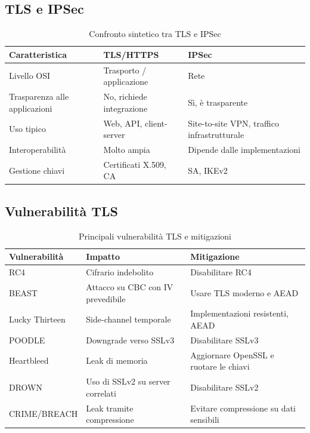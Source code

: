 \documentclass[12pt, a4paper]{report}
\begin{document}
\subsection{TLS e IPSec}
\begin{table}[h]
	\centering
	\caption{Confronto sintetico tra TLS e IPSec}
	\begin{tabular}{|p{3.5cm}|p{5.5cm}|p{5.5cm}|}
		\hline
		Caratteristica & TLS/HTTPS & IPSec \\
		\hline
		Livello OSI & Trasporto / applicazione & Rete \\
		\hline
		Trasparenza alle applicazioni & No, richiede integrazione & S\`i, \`e trasparente \\
		\hline
		Uso tipico & Web, API, client-server & Site-to-site VPN, traffico infrastrutturale \\
		\hline
		Interoperabilit\`a & Molto ampia & Dipende dalle implementazioni \\
		\hline
		Gestione chiavi & Certificati X.509, CA & SA, IKEv2 \\
		\hline
	\end{tabular}
\end{table}

\subsection{Vulnerabilit\`a TLS}
\begin{table}[h]
	\centering
	\caption{Principali vulnerabilit\`a TLS e mitigazioni}
	\begin{tabular}{|p{3.5cm}|p{5cm}|p{5cm}|}
		\hline
		Vulnerabilit\`a & Impatto & Mitigazione \\
		\hline
		RC4 & Cifrario indebolito & Disabilitare RC4 \\
		\hline
		BEAST & Attacco su CBC con IV prevedibile & Usare TLS moderno e AEAD \\
		\hline
		Lucky Thirteen & Side-channel temporale & Implementazioni resistenti, AEAD \\
		\hline
		POODLE & Downgrade verso SSLv3 & Disabilitare SSLv3 \\
		\hline
		Heartbleed & Leak di memoria & Aggiornare OpenSSL e ruotare le chiavi \\
		\hline
		DROWN & Uso di SSLv2 su server correlati & Disabilitare SSLv2 \\
		\hline
		CRIME/BREACH & Leak tramite compressione & Evitare compressione su dati sensibili \\
		\hline
	\end{tabular}
\end{table}
\end{document}
